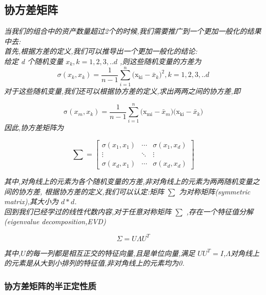 \documentclass{scrartcl}
\numberwithin{equation}{section}   %
\begin{document}
\subsection{协方差矩阵}

\textsl{当我们的组合中的资产数量超过2个的时候,我们需要推广到一个更加一般化的结果中去:
    \\首先,根据方差的定义,我们可以推导出一个更加一般化的结论:\\给定 d 个随机变量 $\mathit{x_k,k=1,2,3,..d}$ ,则这些随机变量的方差为}
\begin{equation}
    \sigma(x_k,x_k) =\frac{1}{n - 1} \sum^n_{i=1} {(\mathrm{x_{ki}}  - \bar{x}_k})^2,k=1,2,3,..d
\end{equation}
\textsl{对于这些随机变量,我们还可以根据协方差的定义,求出两两之间的协方差,即}

\begin{equation}
    \mathrm{\sigma}(x_m,x_k)=  \frac{1}{n - 1} \sum^n_{i=1} {(\mathrm{x_{mi}}  - \bar{x}_m}) {(\mathrm{x_{ki}}  - \bar{x}_k})
\end{equation}
\textsl{因此,协方差矩阵为}

\begin{equation}
    \sum =\left[ \begin{array}{ccc}
            \sigma(x_1,x_1) & \cdots & \sigma(x_1,x_d) \\
            \vdots          & \ddots & \vdots          \\
            \sigma(x_d,x_1) & \cdots & \sigma(x_d,x_d)
        \end{array}
        \right ]
\end{equation}

\textsl{其中,对角线上的元素为各个随机变量的方差,非对角线上的元素为两两随机变量之间的协方差,
    根据协方差的定义,我们可以认定:矩阵 $ \sum $ 为对称矩阵(symmetric matrix),其大小为 $d*d$.
    \\回到我们已经学过的线性代数内容,对于任意对称矩阵 $ \sum $ ,存在一个特征值分解(eigenvalue decomposition,EVD)}

\begin{equation}
    \Sigma = U\Lambda U^T
\end{equation}

\textsl{其中,$U$的每一列都是相互正交的特征向量,且是单位向量,满足 $UU^T=I$,$\Lambda$对角线上的元素是从大到小排列的特征值,非对角线上的元素均为0.
}
\subsubsection{协方差矩阵的半正定性质}
\end{document}
